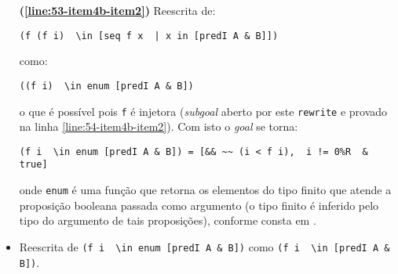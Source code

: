 \begin{enumerate}[label=\textbf{\roman*.}]
\begin{enumerate}[label=\textbf{\roman{enumi}.(\alph*)}]
\begin{enumerate}[label=\textbf{(\alph{enumii}.\arabic*)}]
\begin{enumerate}[listparindent=\parindent]
\begin{itemize}
                                                \item[\textbf{(\ref{line:53-item4b-item2})}] Reescrita de:
                                                        \begin{lstlisting}[language=coq,frame=single,tabsize=1]
(f (f i)  \in [seq f x  | x in [predI A & B]])
                                                        \end{lstlisting}
                                                como:
                                                        \begin{lstlisting}[language=coq,frame=single,tabsize=1]
((f i)  \in enum [predI A & B])
                                                        \end{lstlisting}
                                                o que é possível pois \lstinline[language=coq]|f| é injetora (\textit{subgoal} aberto por este \lstinline[language=coq]|rewrite| e provado na linha \ref{line:54-item4b-item2}). Com isto o
                                                \textit{goal} se torna:
                                                        \begin{lstlisting}[language=coq,frame=single,tabsize=1]
(f i  \in enum [predI A & B]) = [&& ~~ (i < f i),  i != 0%R  & true]
                                                        \end{lstlisting}
                                                onde \lstinline[language=coq]|enum| é uma função que retorna os elementos do tipo finito que atende a proposição booleana passada como argumento (o tipo finito é inferido pelo tipo do argumento de tais proposições), conforme consta em \cite{mathcomp-fintype}.

                                                \item[\textbf{(\ref{line:55-item4b-item2})}] Reescrita de \lstinline[language=coq]|(f i  \in enum [predI A & B])| como \lstinline[language=coq]|(f i  \in [predI A & B])|.
                                                

\end{itemize}
\end{enumerate}
\end{enumerate}
\end{enumerate}
\end{enumerate}

